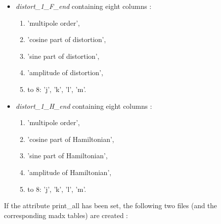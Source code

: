 \begin{itemize} 
    \item \textit{distort\_1\_F\_end} containing eight columns : 
      \begin{enumerate}
         \item 'multipole order', 
         \item 'cosine part of distortion', 
         \item 'sine part of distortion',
         \item 'amplitude of distortion', 
         \item to 8: 'j', 'k', 'l', 'm'. 
      \end{enumerate}
    \item \textit{distort\_1\_H\_end}  containing eight columns : 
      \begin{enumerate}
         \item 'multipole order', 
         \item 'cosine part of Hamiltonian', 
         \item 'sine part of Hamiltonian', 
         \item 'amplitude of Hamiltonian', 
         \item to 8: 'j', 'k', 'l', 'm'.  
      \end{enumerate}
\end{itemize}

If the attribute print\_all has been set, the following two files  (and
the corresponding madx tables) are created :  

